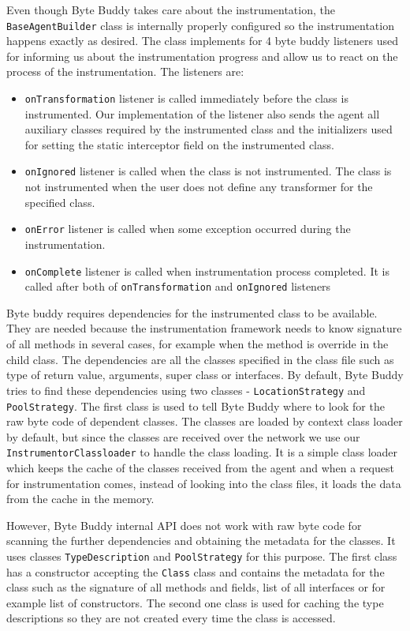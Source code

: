 Even though Byte Buddy takes care about the instrumentation, the \texttt{BaseAgentBuilder} class is internally properly configured so the instrumentation happens exactly as desired. The class implements for 4 byte buddy listeners used for informing us about the instrumentation progress and allow us to react on the process of the instrumentation. The listeners are:
\begin{itemize}
	\item \texttt{onTransformation} listener is called immediately before the class is instrumented. Our implementation of the listener also sends the agent all auxiliary classes required by the instrumented class and the initializers used for setting the static interceptor field on the instrumented class.
	\item \texttt{onIgnored} listener is called when the class is not instrumented. The class is not instrumented when the user does not define any transformer for the specified class.
	\item \texttt{onError} listener is called when some exception occurred during the instrumentation.
	\item \texttt{onComplete} listener is called when instrumentation process completed. It is called after both of \texttt{onTransformation} and \texttt{onIgnored} listeners
\end{itemize}



Byte buddy requires dependencies for the instrumented class to be available. They are needed because the instrumentation framework needs to know signature of all methods in several cases, for example when the method is override in the child class. The dependencies are all the classes specified in the class file such as type of return value, arguments, super class or interfaces. 
By default, Byte Buddy tries to find these dependencies using two classes - \texttt{LocationStrategy} and \texttt{PoolStrategy}. The first class is used to tell Byte Buddy where to look for the raw byte code of dependent classes. The classes are loaded by context class loader by default, but since the classes are received over the network we use our \texttt{InstrumentorClassloader} to handle the class loading. It is a simple class loader which keeps the cache of the classes received from the agent and when a request for instrumentation comes, instead of looking into the class files, it loads the data from the cache in the memory.

However, Byte Buddy internal API does not work with raw byte code for scanning the further dependencies and obtaining the metadata for the classes. It uses classes \texttt{TypeDescription} and \texttt{PoolStrategy} for this purpose. The first class has a constructor accepting the \texttt{Class} class and contains the metadata for the class such as the signature of all methods and fields, list of all interfaces or for example list of constructors. The second one class is used for caching the type descriptions so they are not created every time the class is accessed. 

